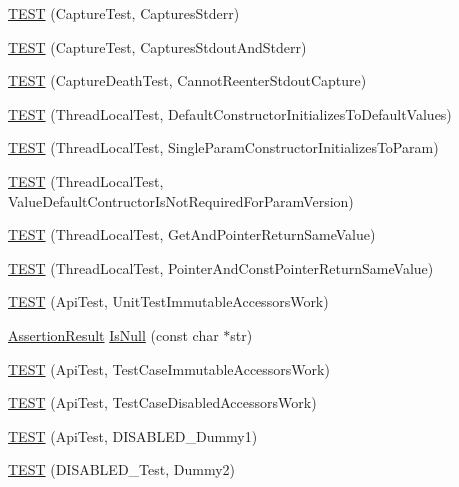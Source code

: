\begin{DoxyCompactItemize}
\hyperlink{namespacetesting_1_1internal_abbc9510a4f690912c32835213d95198f}{T\-E\-S\-T} (Capture\-Test, Captures\-Stderr)
\item 
\hyperlink{namespacetesting_1_1internal_a341ff65f3ca44b27fc51f03a9a05bee8}{T\-E\-S\-T} (Capture\-Test, Captures\-Stdout\-And\-Stderr)
\item 
\hyperlink{namespacetesting_1_1internal_a325a786fb22b87e5aa8d8f584b42ab09}{T\-E\-S\-T} (Capture\-Death\-Test, Cannot\-Reenter\-Stdout\-Capture)
\item 
\hyperlink{namespacetesting_1_1internal_af366e28e373f36480decc2ea586f48f0}{T\-E\-S\-T} (Thread\-Local\-Test, Default\-Constructor\-Initializes\-To\-Default\-Values)
\item 
\hyperlink{namespacetesting_1_1internal_a5a52dd578217050e621ebd2aace97a70}{T\-E\-S\-T} (Thread\-Local\-Test, Single\-Param\-Constructor\-Initializes\-To\-Param)
\item 
\hyperlink{namespacetesting_1_1internal_a6dffc8331590224259b60e855ad07d03}{T\-E\-S\-T} (Thread\-Local\-Test, Value\-Default\-Contructor\-Is\-Not\-Required\-For\-Param\-Version)
\item 
\hyperlink{namespacetesting_1_1internal_a0e7c2d58a313bec0821df19f44351d84}{T\-E\-S\-T} (Thread\-Local\-Test, Get\-And\-Pointer\-Return\-Same\-Value)
\item 
\hyperlink{namespacetesting_1_1internal_aaed45d6ba960f02e8d3d042c606bc98e}{T\-E\-S\-T} (Thread\-Local\-Test, Pointer\-And\-Const\-Pointer\-Return\-Same\-Value)
\item 
\hyperlink{namespacetesting_1_1internal_a9ac879683abb06d1c0bba3a339ea2f40}{T\-E\-S\-T} (Api\-Test, Unit\-Test\-Immutable\-Accessors\-Work)
\item 
\hyperlink{classtesting_1_1_assertion_result}{Assertion\-Result} \hyperlink{namespacetesting_1_1internal_adcfd37a66bc4cb0e8291cf46e1a6c72b}{Is\-Null} (const char $\ast$str)
\item 
\hyperlink{namespacetesting_1_1internal_a33809333fe5b5f33c2bd56ddcdd1dbb6}{T\-E\-S\-T} (Api\-Test, Test\-Case\-Immutable\-Accessors\-Work)
\item 
\hyperlink{namespacetesting_1_1internal_a459d693357db8f8f48c26a8bee3ffb84}{T\-E\-S\-T} (Api\-Test, Test\-Case\-Disabled\-Accessors\-Work)
\item 
\hyperlink{namespacetesting_1_1internal_a9ed5f89c92532506899e3908e79af4de}{T\-E\-S\-T} (Api\-Test, D\-I\-S\-A\-B\-L\-E\-D\-\_\-\-Dummy1)
\item 
\hyperlink{namespacetesting_1_1internal_a4a84433419426d1c1b87ce998267b0d4}{T\-E\-S\-T} (D\-I\-S\-A\-B\-L\-E\-D\-\_\-\-Test, Dummy2)
\end{DoxyCompactItemize}
